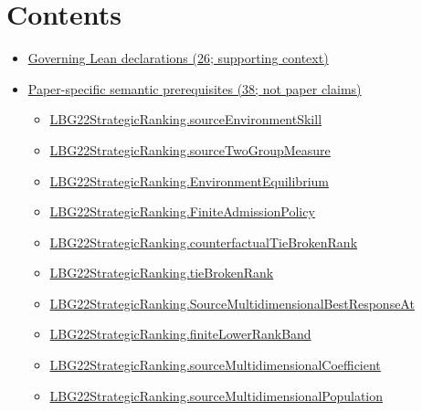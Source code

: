 \documentclass[10pt]{article}
\begin{document}
\section*{Contents}
\begin{itemize}[leftmargin=1.2em]
\item \hyperlink{governing-declaration-section-5ef5ef0364b6939c}{Governing Lean declarations (26; supporting context)}
\item \hyperlink{paper-prerequisite-section-5ef5ef0364b6939c}{Paper-specific semantic prerequisites (38; not paper claims)}
\begin{itemize}[leftmargin=1.2em]
\item \hyperlink{paper-prerequisite-73413973c7594479}{LBG22\allowbreak{}Strategic\allowbreak{}Ranking.\allowbreak{}source\allowbreak{}Environment\allowbreak{}Skill}
\item \hyperlink{paper-prerequisite-5b3be494cde30a37}{LBG22\allowbreak{}Strategic\allowbreak{}Ranking.\allowbreak{}source\allowbreak{}Two\allowbreak{}Group\allowbreak{}Measure}
\item \hyperlink{paper-prerequisite-b8e06f39e94d0049}{LBG22\allowbreak{}Strategic\allowbreak{}Ranking.\allowbreak{}Environment\allowbreak{}Equilibrium}
\item \hyperlink{paper-prerequisite-d056dd7c8060653c}{LBG22\allowbreak{}Strategic\allowbreak{}Ranking.\allowbreak{}Finite\allowbreak{}Admission\allowbreak{}Policy}
\item \hyperlink{paper-prerequisite-6ed45e46d01eadeb}{LBG22\allowbreak{}Strategic\allowbreak{}Ranking.\allowbreak{}counterfactual\allowbreak{}Tie\allowbreak{}Broken\allowbreak{}Rank}
\item \hyperlink{paper-prerequisite-b7c71e53177b76c6}{LBG22\allowbreak{}Strategic\allowbreak{}Ranking.\allowbreak{}tie\allowbreak{}Broken\allowbreak{}Rank}
\item \hyperlink{paper-prerequisite-59d181ae71b7b024}{LBG22\allowbreak{}Strategic\allowbreak{}Ranking.\allowbreak{}Source\allowbreak{}Multidimensional\allowbreak{}Best\allowbreak{}Response\allowbreak{}At}
\item \hyperlink{paper-prerequisite-a42f440ddc254fa7}{LBG22\allowbreak{}Strategic\allowbreak{}Ranking.\allowbreak{}finite\allowbreak{}Lower\allowbreak{}Rank\allowbreak{}Band}
\item \hyperlink{paper-prerequisite-e57e55071c75ce91}{LBG22\allowbreak{}Strategic\allowbreak{}Ranking.\allowbreak{}source\allowbreak{}Multidimensional\allowbreak{}Coefficient}
\item \hyperlink{paper-prerequisite-16d135799a0f0491}{LBG22\allowbreak{}Strategic\allowbreak{}Ranking.\allowbreak{}source\allowbreak{}Multidimensional\allowbreak{}Population}

\end{itemize}
\end{itemize}
\end{document}
